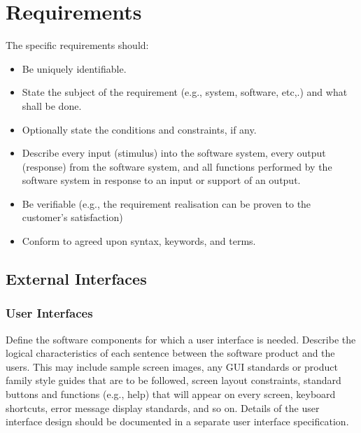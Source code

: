 \chapter{Requirements}


The specific requirements should:

\begin{itemize}
	\item Be uniquely identifiable.
	\item State the subject of the requirement (e.g., system, software, etc,.) and
		what shall be done.
	\item Optionally state the conditions and constraints, if any.
	\item Describe every input (stimulus) into the software system, every output
		(response) from the software system, and all functions performed by the
		software system in response to an input or support of an output.
	\item Be verifiable (e.g., the requirement realisation can be proven to the
		customer's satisfaction)
	\item Conform to agreed upon syntax, keywords, and terms.
\end{itemize}

\section{External Interfaces}



\subsection{User Interfaces}

Define the software components for which a user interface is needed. Describe
the logical characteristics of each sentence between the software product and
the users. This may include sample screen images, any GUI standards or product
family style guides that are to be followed, screen layout constraints, standard
buttons and functions (e.g., help) that will appear on every screen, keyboard
shortcuts, error message display standards, and so on. Details of the user
interface design should be documented in a separate user interface
specification.

